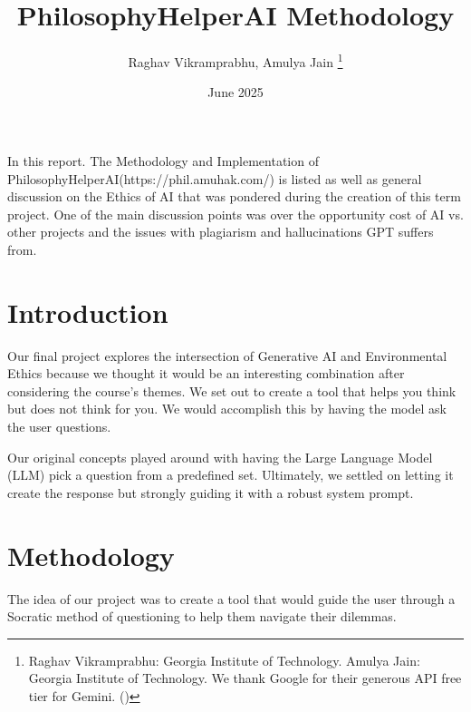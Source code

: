 \documentclass[letterpaper,11pt,leqno]{article}
\begin{document}
\title{PhilosophyHelperAI Methodology}

\author{Raghav Vikramprabhu, Amulya Jain
  \thanks{Raghav Vikramprabhu: Georgia Institute of Technology. Amulya Jain: Georgia Institute of Technology. We thank Google for their generous API free tier for Gemini. (\cite{GoogleAIDev}) }}

\date{June 2025}


\begin{titlepage}
  \maketitle

  In this report. The Methodology and Implementation of PhilosophyHelperAI(https://phil.amuhak.com/) is listed as well as general discussion on the Ethics of AI that was pondered during the creation of this term project. One of the main discussion points was over the opportunity cost of AI vs. other projects and the issues with plagiarism and hallucinations GPT suffers from. 

\end{titlepage}

\section{Introduction}\label{s:introduction}

Our final project explores the intersection of Generative AI and Environmental Ethics because we thought it would be an interesting combination after considering the course's themes. We set out to create a tool that helps you think but does not think for you. We would accomplish this by having the model ask the user questions.

Our original concepts played around with having the Large Language Model (LLM) pick a question from a predefined set. Ultimately, we settled on letting it create the response but strongly guiding it with a robust system prompt.

\section{Methodology}
The idea of our project was to create a tool that would guide the user through a Socratic method of questioning to help them navigate their dilemmas.
\end{document}
